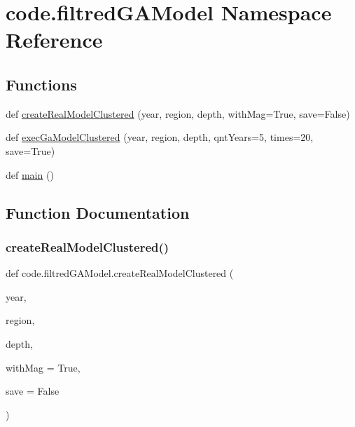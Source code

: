 \hypertarget{namespacecode_1_1filtred_g_a_model}{}\section{code.\+filtred\+G\+A\+Model Namespace Reference}
\label{namespacecode_1_1filtred_g_a_model}
\subsection*{Functions}
\begin{DoxyCompactItemize}
\item 
def \hyperlink{namespacecode_1_1filtred_g_a_model_adac8da7dc280895725d8ebf4438ce4cf}{create\+Real\+Model\+Clustered} (year, region, depth, with\+Mag=True, save=False)
\item 
def \hyperlink{namespacecode_1_1filtred_g_a_model_a6c4e76887e748466ad75fce8994b937f}{exec\+Ga\+Model\+Clustered} (year, region, depth, qnt\+Years=5, times=20, save=True)
\item 
def \hyperlink{namespacecode_1_1filtred_g_a_model_a5587249a8709bb978a7d63424b6bc023}{main} ()
\end{DoxyCompactItemize}


\subsection{Function Documentation}
\mbox{\label{namespacecode_1_1filtred_g_a_model_adac8da7dc280895725d8ebf4438ce4cf}} 
\subsubsection{\texorpdfstring{create\+Real\+Model\+Clustered()}{createRealModelClustered()}}
{\footnotesize\ttfamily def code.\+filtred\+G\+A\+Model.\+create\+Real\+Model\+Clustered (\begin{DoxyParamCaption}\item[{}]{year,  }\item[{}]{region,  }\item[{}]{depth,  }\item[{}]{with\+Mag = {\ttfamily True},  }\item[{}]{save = {\ttfamily False} }\end{DoxyParamCaption})}

